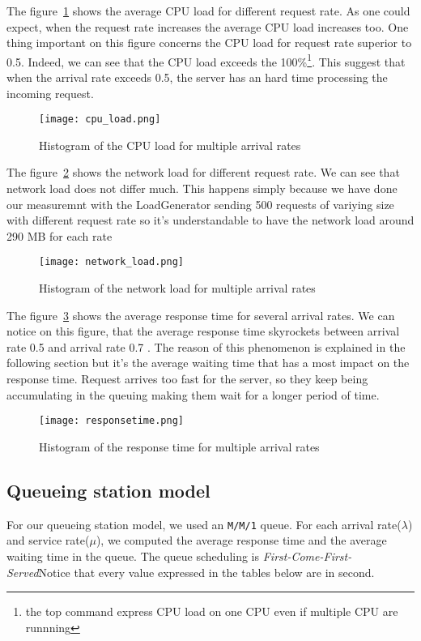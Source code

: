 The figure~\ref{fig:histocpu} shows the average CPU load for different request rate. As one could
expect, when the request rate increases the average CPU load increases too. One thing important
on this figure concerns the CPU load for request rate superior to 0.5. Indeed, we can see that the
CPU load exceeds the 100\%\footnote{the top command express CPU load on one CPU even if multiple
CPU are runnning}. This suggest that when the arrival rate exceeds 0.5, the server has an hard time
processing the incoming request.

\begin{figure}[!ht]
    \centering
    \texttt{[image: cpu\_load.png]}
    \caption{Histogram of the CPU load for multiple arrival rates}
    \label{fig:histocpu}
\end{figure}
The figure~\ref{fig:histonetwork} shows the network load for different request rate. We can see that
network load does not differ much. This happens simply because we have done our measuremnt with the
LoadGenerator sending 500 requests of variying size with different request rate so it's understandable to have the network load around 290 MB for each rate
\begin{figure}[!ht]
    \centering
    \texttt{[image: network\_load.png]}
    \caption{Histogram of the network load for multiple arrival rates}
    \label{fig:histonetwork}
\end{figure}

The figure~\ref{fig:historesponse} shows the average response time for several arrival rates.
We can notice on this figure, that the average response time skyrockets between arrival rate
0.5 and arrival rate 0.7 . The reason of this phenomenon is explained in the following section but
it's the average waiting time that has a most impact on the response time. Request arrives too fast
for the server, so they keep being accumulating in the queuing making them wait for a longer period
of time.
\begin{figure}[!ht]
    \centering
    \texttt{[image: responsetime.png]}
    \caption{Histogram of the response time for multiple arrival rates}
    \label{fig:historesponse}
\end{figure}

\subsection{Queueing station model}
\label{sub:Queueing station model}
For our queueing station model, we used an \texttt{M/M/1} queue. For each
arrival rate($\lambda$) and service rate($\mu$), we computed the
average response time and the average waiting time in the queue. The queue 
scheduling is \textit{First-Come-First-Served}Notice that
every value expressed in the tables below are in second.



